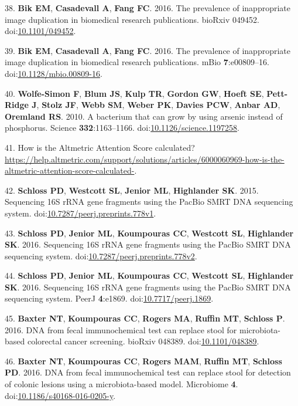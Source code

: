 \documentclass[11,]{article}
\begin{document}
38. \textbf{Bik EM}, \textbf{Casadevall A}, \textbf{Fang FC}. 2016. The
prevalence of inappropriate image duplication in biomedical research
publications. bioRxiv 049452.
doi:\href{http://dx.doi.org/10.1101/049452}{10.1101/049452}.

39. \textbf{Bik EM}, \textbf{Casadevall A}, \textbf{Fang FC}. 2016. The
prevalence of inappropriate image duplication in biomedical research
publications. mBio \textbf{7}:e00809--16.
doi:\href{http://dx.doi.org/10.1128/mbio.00809-16}{10.1128/mbio.00809-16}.

40. \textbf{Wolfe-Simon F}, \textbf{Blum JS}, \textbf{Kulp TR},
\textbf{Gordon GW}, \textbf{Hoeft SE}, \textbf{Pett-Ridge J},
\textbf{Stolz JF}, \textbf{Webb SM}, \textbf{Weber PK}, \textbf{Davies
PCW}, \textbf{Anbar AD}, \textbf{Oremland RS}. 2010. A bacterium that
can grow by using arsenic instead of phosphorus. Science
\textbf{332}:1163--1166.
doi:\href{http://dx.doi.org/10.1126/science.1197258}{10.1126/science.1197258}.

41. How is the Altmetric Attention Score calculated?
\url{https://help.altmetric.com/support/solutions/articles/6000060969-how-is-the-altmetric-attention-score-calculated-}.

42. \textbf{Schloss PD}, \textbf{Westcott SL}, \textbf{Jenior ML},
\textbf{Highlander SK}. 2015. Sequencing 16S rRNA gene fragments using
the PacBio SMRT DNA sequencing system.
doi:\href{http://dx.doi.org/10.7287/peerj.preprints.778v1}{10.7287/peerj.preprints.778v1}.

43. \textbf{Schloss PD}, \textbf{Jenior ML}, \textbf{Koumpouras CC},
\textbf{Westcott SL}, \textbf{Highlander SK}. 2016. Sequencing 16S rRNA
gene fragments using the PacBio SMRT DNA sequencing system.
doi:\href{http://dx.doi.org/10.7287/peerj.preprints.778v2}{10.7287/peerj.preprints.778v2}.

44. \textbf{Schloss PD}, \textbf{Jenior ML}, \textbf{Koumpouras CC},
\textbf{Westcott SL}, \textbf{Highlander SK}. 2016. Sequencing 16S rRNA
gene fragments using the PacBio SMRT DNA sequencing system. PeerJ
\textbf{4}:e1869.
doi:\href{http://dx.doi.org/10.7717/peerj.1869}{10.7717/peerj.1869}.

45. \textbf{Baxter NT}, \textbf{Koumpouras CC}, \textbf{Rogers MA},
\textbf{Ruffin MT}, \textbf{Schloss P}. 2016. DNA from fecal
immunochemical test can replace stool for microbiota-based colorectal
cancer screening. bioRxiv 048389.
doi:\href{http://dx.doi.org/10.1101/048389}{10.1101/048389}.

46. \textbf{Baxter NT}, \textbf{Koumpouras CC}, \textbf{Rogers MAM},
\textbf{Ruffin MT}, \textbf{Schloss PD}. 2016. DNA from fecal
immunochemical test can replace stool for detection of colonic lesions
using a microbiota-based model. Microbiome \textbf{4}.
doi:\href{http://dx.doi.org/10.1186/s40168-016-0205-y}{10.1186/s40168-016-0205-y}.
\end{document}
